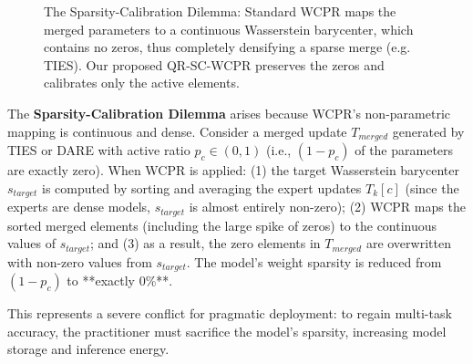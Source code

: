 \documentclass{article}
\theoremstyle{plain}
\theoremstyle{definition}
\theoremstyle{remark}
\begin{document}
\begin{figure}[t]
\centering
{}
\caption{The Sparsity-Calibration Dilemma: Standard WCPR maps the merged parameters to a continuous Wasserstein barycenter, which contains no zeros, thus completely densifying a sparse merge (e.g. TIES). Our proposed QR-SC-WCPR preserves the zeros and calibrates only the active elements.}
\label{fig:dilemma}
\end{figure}

The \textbf{Sparsity-Calibration Dilemma} arises because WCPR's non-parametric mapping is continuous and dense. Consider a merged update $T_{merged}$ generated by TIES or DARE with active ratio $p_c \in (0, 1)$ (i.e., $(1-p_c)$ of the parameters are exactly zero). When WCPR is applied: (1) the target Wasserstein barycenter $s_{target}$ is computed by sorting and averaging the expert updates $T_k[c]$ (since the experts are dense models, $s_{target}$ is almost entirely non-zero); (2) WCPR maps the sorted merged elements (including the large spike of zeros) to the continuous values of $s_{target}$; and (3) as a result, the zero elements in $T_{merged}$ are overwritten with non-zero values from $s_{target}$. The model's weight sparsity is reduced from $(1-p_c)$ to **exactly 0\%**.

This represents a severe conflict for pragmatic deployment: to regain multi-task accuracy, the practitioner must sacrifice the model's sparsity, increasing model storage and inference energy.
\end{document}
